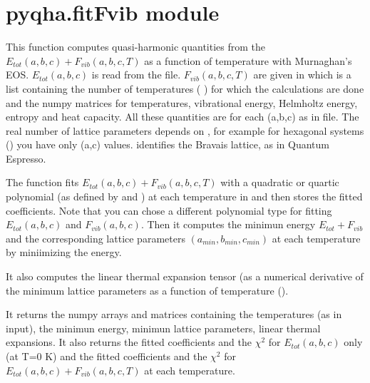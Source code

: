 \documentclass[letterpaper,10pt,english]{sphinxmanual}
\begin{document}
\section{pyqha.fitFvib module}
\label{pyqha:pyqha-fitfvib-module}\label{pyqha:module-pyqha.fitFvib}

\begin{fulllineitems}
This function computes quasi-harmonic quantities from the 
\(E_{tot}(a,b,c)+F_{vib}(a,b,c,T)\) as a function of temperature with Murnaghan's
EOS. \(E_{tot}(a,b,c)\) is read from the  file. \(F_{vib}(a,b,c,T)\)
are given in  which is a list containing the number of temperatures
(  ) for which the calculations are done and the numpy matrices for 
temperatures, vibrational energy, Helmholtz energy, entropy and
heat capacity. All these quantities are for each (a,b,c) as in  file. The 
real number of lattice parameters depends on , for example for 
hexagonal systems () you have only (a,c) values.  identifies
the Bravais lattice, as in Quantum Espresso.

The function fits \(E_{tot}(a,b,c)+F_{vib}(a,b,c,T)\) with a quadratic
or quartic polynomial (as defined by  and  ) at each
temperature in  and then stores the fitted coefficients.    
Note that you can chose a different polynomial type for fitting \(E_{tot}(a,b,c)\)
and \(F_{vib}(a,b,c)\). Then it computes the minimun energy \(E_{tot}+F_{vib}\)
and the corresponding lattice parameters \((a_{min},b_{min},c_{min})\) 
at each temperature by miniimizing the energy.

It also computes the linear thermal expansion tensor (as a numerical derivative of
the minimum lattice parameters as a function of temperature ().

It returns the numpy arrays and matrices containing the temperatures (as in input), the
minimun energy, minimun lattice parameters, linear thermal expansions. It also
returns the fitted coefficients and the \(\chi^2\) for \(E_{tot}(a,b,c)\) 
only (at T=0 K) and the fitted coefficients and the \(\chi^2\) for 
\(E_{tot}(a,b,c)+F_{vib}(a,b,c,T)\) at each temperature.


\end{fulllineitems}
\end{document}
